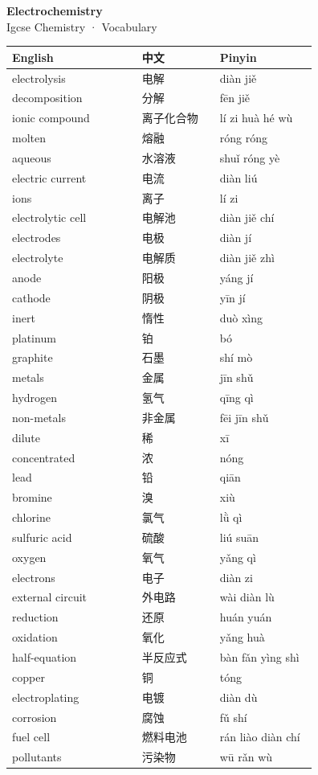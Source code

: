 \documentclass[11pt]{article}
\begin{document}
\begin{center}
  {\LARGE\bfseries Electrochemistry}\\[0.35em]
  {\large Igcse Chemistry · Vocabulary}
\end{center}
\vspace{0.6em}

\begin{longtable}{@{}p{0.40\linewidth}p{0.24\linewidth}p{0.30\linewidth}@{}}
\toprule
\textbf{English} & \textbf{中文} & \textbf{Pinyin} \\
\midrule
\endhead
\bottomrule
\endlastfoot
electrolysis & 电解 & diàn jiě \\
decomposition & 分解 & fēn jiě \\
ionic compound & 离子化合物 & lí zi huà hé wù \\
molten & 熔融 & róng róng \\
aqueous & 水溶液 & shuǐ róng yè \\
electric current & 电流 & diàn liú \\
ions & 离子 & lí zi \\
electrolytic cell & 电解池 & diàn jiě chí \\
electrodes & 电极 & diàn jí \\
electrolyte & 电解质 & diàn jiě zhì \\
anode & 阳极 & yáng jí \\
cathode & 阴极 & yīn jí \\
inert & 惰性 & duò xìng \\
platinum & 铂 & bó \\
graphite & 石墨 & shí mò \\
metals & 金属 & jīn shǔ \\
hydrogen & 氢气 & qīng qì \\
non-metals & 非金属 & fēi jīn shǔ \\
dilute & 稀 & xī \\
concentrated & 浓 & nóng \\
lead & 铅 & qiān \\
bromine & 溴 & xiù \\
chlorine & 氯气 & lǜ qì \\
sulfuric acid & 硫酸 & liú suān \\
oxygen & 氧气 & yǎng qì \\
electrons & 电子 & diàn zi \\
external circuit & 外电路 & wài diàn lù \\
reduction & 还原 & huán yuán \\
oxidation & 氧化 & yǎng huà \\
half-equation & 半反应式 & bàn fǎn yìng shì \\
copper & 铜 & tóng \\
electroplating & 电镀 & diàn dù \\
corrosion & 腐蚀 & fǔ shí \\
fuel cell & 燃料电池 & rán liào diàn chí \\
pollutants & 污染物 & wū rǎn wù \\
\end{longtable}
\end{document}
